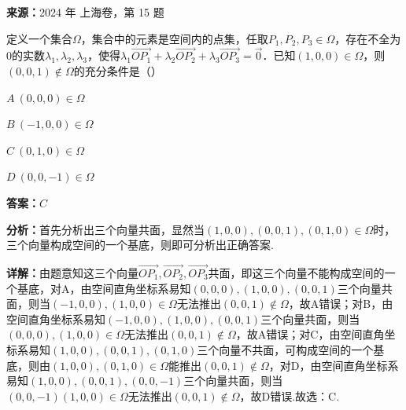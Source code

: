 \begin{question}[points=5]
\textbf{来源：}2024 年 上海卷，第 15 题\par
定义一个集合$\Omega$，集合中的元素是空间内的点集，任取$P_1,P_2,P_3\in\Omega$，存在不全为0的实数$\lambda_1,\lambda_2,\lambda_3$，使得$\lambda_1\overrightarrow{OP_1}+\lambda_2\overrightarrow{OP_2}+\lambda_3\overrightarrow{OP_3}=\vec{0}$．已知$(1,0,0)\in\Omega$，则$(0,0,1)\notin\Omega$的充分条件是（\quad\quad）
\begin{choices}
  \item $A\ (0,0,0)\in\Omega$
  \item $B\ (-1,0,0)\in\Omega$
  \item $C\ (0,1,0)\in\Omega$
  \item $D\ (0,0,-1)\in\Omega$
\end{choices}
\begin{solution}
\textbf{答案：}$C$

\textbf{分析：}首先分析出三个向量共面，显然当$(1,0,0),(0,0,1),(0,1,0)\in\Omega$时，三个向量构成空间的一个基底，则即可分析出正确答案.

\textbf{详解：}由题意知这三个向量$\overrightarrow{OP_1},\overrightarrow{OP_2},\overrightarrow{OP_3}$共面，即这三个向量不能构成空间的一个基底，对A，由空间直角坐标系易知$(0,0,0),(1,0,0),(0,0,1)$三个向量共面，则当$(-1,0,0),(1,0,0)\in\Omega$无法推出$(0,0,1)\notin\Omega$，故A错误；对B，由空间直角坐标系易知$(-1,0,0),(1,0,0),(0,0,1)$三个向量共面，则当$(0,0,0),(1,0,0)\in\Omega$无法推出$(0,0,1)\notin\Omega$，故A错误；对C，由空间直角坐标系易知$(1,0,0),(0,0,1),(0,1,0)$三个向量不共面，可构成空间的一个基底，则由$(1,0,0),(0,1,0)\in\Omega$能推出$(0,0,1)\notin\Omega$，对D，由空间直角坐标系易知$(1,0,0),(0,0,1),(0,0,-1)$三个向量共面，则当$(0,0,-1)(1,0,0)\in\Omega$无法推出$(0,0,1)\notin\Omega$，故D错误.故选：C.
\end{solution}
\end{question}


